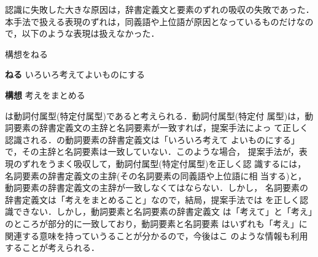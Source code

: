 \documentclass{nlp}
\begin{document}
認識に失敗した大きな原因は，辞書定義文と要素のずれの吸収の失敗であった．
本手法で扱える表現のずれは，同義語や上位語が原因となっているものだけなの
で，以下のような表現は扱えなかった．
\begin{example}
 \item 構想をねる 

 {\bf ねる} \hspace{10pt}いろいろ考えてよいものにする
 
 {\bf 構想} \hspace{10pt}考えをまとめる
\end{example}
は動詞付属型(特定付属型)であると考えられる．動詞付属型(特定付
属型)は，動詞要素の辞書定義文の主辞と名詞要素が一致すれば，提案手法によっ
て正しく認識される．の動詞要素の辞書定義文は「いろいろ考えて
よいものにする」で，その主辞と名詞要素は一致していない．このような場合，
提案手法が，表現のずれをうまく吸収して，動詞付属型(特定付属型)を正しく認
識するには，名詞要素の辞書定義文の主辞(その名詞要素の同義語や上位語に相
当する)と，動詞要素の辞書定義文の主辞が一致しなくてはならない．しかし，
名詞要素の辞書定義文は「考えをまとめること」なので，結局，提案手法では
を正しく認識できない．しかし，動詞要素と名詞要素の辞書定義文
は「考えて」と「考え」のところが部分的に一致しており，動詞要素と名詞要素
はいずれも「考え」に関連する意味を持っていうることが分かるので，今後はこ
のような情報も利用することが考えられる．
\end{document}
